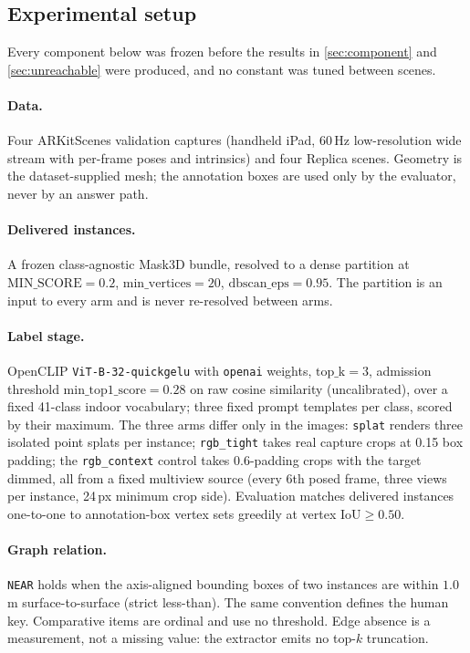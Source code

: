 \subsection{Experimental setup}
\label{sec:setup}

Every component below was frozen before the results in \cref{sec:component} and
\cref{sec:unreachable} were produced, and no constant was tuned between scenes.

\paragraph{Data.}
Four ARKitScenes validation captures (handheld iPad, 60\,Hz low-resolution wide stream
with per-frame poses and intrinsics) and four Replica scenes. Geometry is the
dataset-supplied mesh; the annotation boxes are used only by the evaluator, never by an
answer path.

\paragraph{Delivered instances.}
A frozen class-agnostic Mask3D bundle, resolved to a dense partition at
$\text{MIN\_SCORE}=0.2$, $\text{min\_vertices}=20$, $\text{dbscan\_eps}=0.95$. The
partition is an input to every arm and is never re-resolved between arms.

\paragraph{Label stage.}
OpenCLIP \texttt{ViT-B-32-quickgelu} with \texttt{openai} weights, $\text{top\_k}=3$,
admission threshold $\text{min\_top1\_score}=0.28$ on raw cosine similarity
(uncalibrated), over a fixed 41-class indoor vocabulary; three fixed prompt templates
per class, scored by their maximum. The three arms differ only in the images:
\texttt{splat} renders three isolated point splats per instance; \texttt{rgb\_tight}
takes real capture crops at 0.15 box padding; the \texttt{rgb\_context} control takes
0.6-padding crops with the target dimmed, all from a fixed multiview source (every
6th posed frame, three views per instance, 24\,px minimum crop side). Evaluation
matches delivered instances one-to-one to annotation-box vertex sets greedily at vertex
$\text{IoU}\ge 0.50$.

\paragraph{Graph relation.}
\texttt{NEAR} holds when the axis-aligned bounding boxes of two instances are within
$1.0$\,m surface-to-surface (strict less-than). The same convention defines the human
key. Comparative items are ordinal and use no threshold. Edge absence is a measurement,
not a missing value: the extractor emits no top-$k$ truncation.

